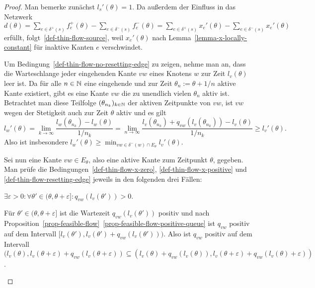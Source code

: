 \begin{proof}
	Man bemerke zunächst $l_s'(\theta) = 1$.
	Da außerdem der Einfluss in das Netzwerk $d(\theta)=  \sum_{e\in \delta^+(s)} f_e^+(\theta) - \sum_{e\in\delta^-(s)} f_e^-(\theta) = \sum_{e\in \delta^+(s)} x_e'(\theta) - \sum_{e\in\delta^-(s)} x_e'(\theta)$ erfüllt, folgt~\ref{def-thin-flow-source}, weil $x_e'(\theta)$ nach Lemma~\ref{lemma-x-locally-constant} für inaktive Kanten $e$ verschwindet.
	
	Um Bedingung~\ref{def-thin-flow-no-resetting-edge} zu zeigen,
	nehme man an, dass die Warteschlange jeder eingehenden Kante $vw$ eines Knotens $w$ zur Zeit $l_v(\theta)$ leer ist.
	Da für alle $n\in\mathbb{N}$ eine eingehende und zur Zeit $\theta_n := \theta + 1/n$ aktive Kante existiert, gibt es eine Kante $vw$ die zu unendlich vielen $\theta_n$ aktiv ist.
	Betrachtet man diese Teilfolge $(\theta_{n_k})_{k\in\mathbb{N}}$ der aktiven Zeitpunkte von $vw$, ist $vw$ wegen der Stetigkeit auch zur Zeit $\theta$ aktiv und es gilt 
	$$l_w'(\theta) = \lim_{k\to\infty} \frac{l_w(\theta_{n_k})- l_w(\theta)}{1/n_k} = \lim_{n\to\infty} \frac{ l_v(\theta_{n_k}) + q_{vw}(l_v(\theta_{n_k})) - l_v(\theta) }{1/n_k} \geq l_v'(\theta).$$
	Also ist insbesondere $l_w'(\theta) \geq \min_{vw\in \delta^-(w)\cap E_\theta} l_v'(\theta)$.
	
	Sei nun eine Kante $vw\in E_\theta$, also eine aktive Kante zum Zeitpunkt $\theta$, gegeben. Man prüfe die Bedingungen~\ref{def-thin-flow-x-zero}, \ref{def-thin-flow-x-positive} und \ref{def-thin-flow-resetting-edge} jeweils in den folgenden drei Fällen:
	
	\begin{description}[leftmargin=0cm, topsep=0cm, itemindent=0.5cm]
		\item[1. Fall:] $\exists \varepsilon > 0:\forall \theta'\in (\theta, \theta + \varepsilon ] : q_{vw}(l_v(\theta')) > 0$.
		
		Für $\theta'\in(\theta,\theta+\varepsilon]$ ist die Wartezeit $q_{vw}(l_v(\theta'))$ positiv und nach Proposition~\ref{prop-feasible-flow}~\ref{prop-feasible-flow-positive-queue} ist $q_{vw}$ positiv auf dem Intervall $[ l_v(\theta') , l_v(\theta')+q_{vw}(l_v(\theta')) )$.
		Also ist $q_{vw}$ positiv auf dem Intervall $( l_v(\theta) , l_v(\theta + \varepsilon) + q_{vw}(l_v(\theta + \varepsilon) )
		\subseteq ( l_v(\theta) + q_{vw}(l_v(\theta)) , l_v(\theta + \varepsilon) + q_{vw}(l_v(\theta) + \varepsilon ) )$.
		

\end{description}
\end{proof}
